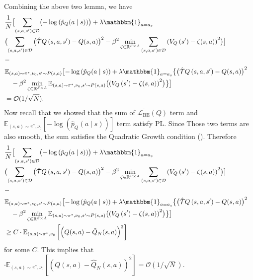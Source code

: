 Combining the above two lemma, we have
\begin{align}
  &\frac{1}{N}\bigl[\sum_{(s,a,s^\prime)\in \mathcal{D}}\bigl({-\log \left(\hat{p}_Q(a \mid s)\right)}\bigr)+ 
\lambda\mathbbm{1}_{a=a_s}\notag
    \\
    &\bigl(  \sum_{(s,a,s^\prime)\in \mathcal{D}} {\bigl(\hat{\mathcal{T}} Q\left(s, a, s^{\prime}\right)-Q(s, a)\bigr)^2}  -\beta^2 \min_{\zeta\in \mathbb{R}^{S\times A}} 
   \sum_{(s,a,s^\prime)\in \mathcal{D}} {\left(V_{Q}\left(s^{\prime}\right)-\zeta(s,a)\right)^2}\bigr) \bigr]\notag
   \\
   &- \notag
   \\
   & \mathbb{E}_{(s, a) \sim \pi^*, \nu_0, s^{\prime} \sim P(s, a)}\bigl[-\log \left(\hat{p}_Q(a \mid s)\right) + \lambda\mathbbm{1}_{a=a_s}\bigl\{\bigl(\hat{\mathcal{T}} Q\left(s, a, s^{\prime}\right)-Q(s, a)\bigr)^2 \notag
    \\
    & \quad -\beta^2  \min_{\zeta\in \mathbb{R}^{S\times A}}  \mathbb{E}_{(s, a) \sim \pi^*, \nu_0, s^{\prime} \sim P(s, a)} \bigl(\left(V_{Q}\left(s^{\prime}\right)-\zeta(s,a)\right)^2\bigr) \bigr\} \bigr]\notag
    &
    \\
     &= \mathcal{O}(1/\sqrt{N}). \notag
\end{align}
\noindent 
Now recall that we showed that the sum of $\overline{\mathcal{L}_{\mathrm{BE}}}(Q)$ term and $\mathbb{E}_{(s, a) \sim \pi^*, \nu_0}\left[-\log \left(\hat{p}_Q(a \mid s)\right)\right]$ term satisfy PL. Since Those two terms are also smooth, the sum satisfies the Quadratic Growth condition (\cite{liao2024error}). Therefore
\begin{align}
  &\frac{1}{N}\bigl[\sum_{(s,a,s^\prime)\in \mathcal{D}}\bigl({-\log \left(\hat{p}_Q(a \mid s)\right)}\bigr)+ 
\lambda\mathbbm{1}_{a=a_s}\notag
    \\
    &\bigl(  \sum_{(s,a,s^\prime)\in \mathcal{D}} {\bigl(\hat{\mathcal{T}} Q\left(s, a, s^{\prime}\right)-Q(s, a)\bigr)^2}  -\beta^2 \min_{\zeta\in \mathbb{R}^{S\times A}} 
   \sum_{(s,a,s^\prime)\in \mathcal{D}} {\left(V_{Q}\left(s^{\prime}\right)-\zeta(s,a)\right)^2}\bigr) \bigr]\notag
   \\
   &- \notag
   \\
   & \mathbb{E}_{(s, a) \sim \pi^*, \nu_0, s^{\prime} \sim P(s, a)}\bigl[-\log \left(\hat{p}_Q(a \mid s)\right) + \lambda\mathbbm{1}_{a=a_s}\bigl\{\bigl(\hat{\mathcal{T}} Q\left(s, a, s^{\prime}\right)-Q(s, a)\bigr)^2 \notag
    \\
    & \quad -\beta^2  \min_{\zeta\in \mathbb{R}^{S\times A}}  \mathbb{E}_{(s, a) \sim \pi^*, \nu_0, s^{\prime} \sim P(s, a)} \bigl(\left(V_{Q}\left(s^{\prime}\right)-\zeta(s,a)\right)^2\bigr) \bigr\} \bigr]\notag
    &
    \\
     &\ge  C\cdot\mathbb{E}_{(s, a) \sim \pi^*, \nu_0}\left[\left(Q(s, a)-\hat{Q}_N(s, a)\right)^2\right] \notag
\end{align}
 for some $C$. This implies that $\cdot\mathbb{E}_{(s, a) \sim \pi^*, \nu_0}\left[\left(Q(s, a)-\hat{Q}_N(s, a)\right)^2\right]=\mathcal{O}(1/\sqrt{N})$.






